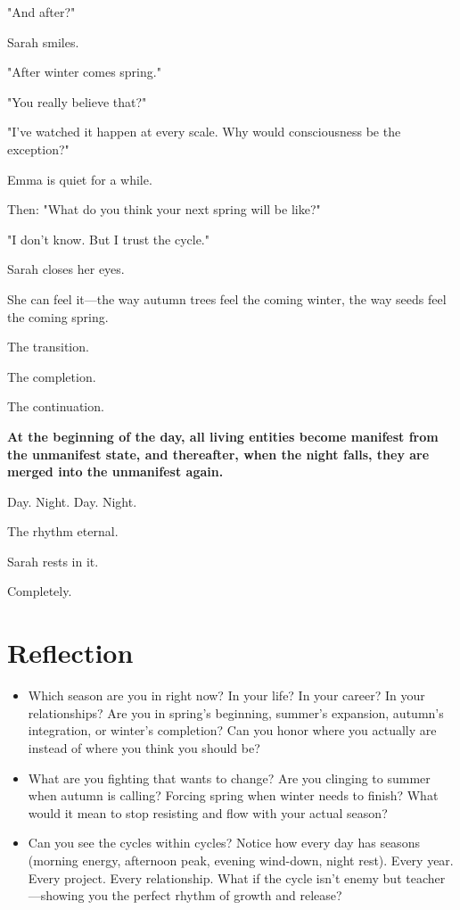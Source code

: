 \documentclass[11pt,twoside]{book}
\begin{document}
"And after?"

Sarah smiles.

"After winter comes spring."

"You really believe that?"

"I've watched it happen at every scale. Why would consciousness be the exception?"

Emma is quiet for a while.

Then: "What do you think your next spring will be like?"

"I don't know. But I trust the cycle."

Sarah closes her eyes.

She can feel it—the way autumn trees feel the coming winter, the way seeds feel the coming spring.

The transition.

The completion.

The continuation.

\textbf{At the beginning of the day, all living entities become manifest from the unmanifest state, and thereafter, when the night falls, they are merged into the unmanifest again.}

Day. Night. Day. Night.

The rhythm eternal.

Sarah rests in it.

Completely.

\section*{Reflection}

\begin{itemize}
\item Which season are you in right now? In your life? In your career? In your relationships? Are you in spring's beginning, summer's expansion, autumn's integration, or winter's completion? Can you honor where you actually are instead of where you think you should be?
\item What are you fighting that wants to change? Are you clinging to summer when autumn is calling? Forcing spring when winter needs to finish? What would it mean to stop resisting and flow with your actual season?
\item Can you see the cycles within cycles? Notice how every day has seasons (morning energy, afternoon peak, evening wind-down, night rest). Every year. Every project. Every relationship. What if the cycle isn't enemy but teacher—showing you the perfect rhythm of growth and release?
\end{itemize}
\end{document}
